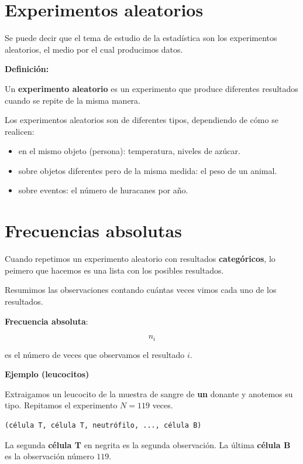 \documentclass[
]{book}
\providecommand{\tightlist}{%
  \setlength{\itemsep}{0pt}\setlength{\parskip}{0pt}}
\begin{document}
\hypertarget{experimentos-aleatorios}{%
\section{Experimentos aleatorios}\label{experimentos-aleatorios}}

Se puede decir que el tema de estudio de la estadística son los experimentos aleatorios, el medio por el cual producimos datos.

\textbf{Definición:}

Un \textbf{experimento aleatorio} es un experimento que produce diferentes resultados cuando se repite de la misma manera.

Los experimentos aleatorios son de diferentes tipos, dependiendo de cómo se realicen:

\begin{itemize}
\tightlist
\item
  en el mismo objeto (persona): temperatura, niveles de azúcar.
\item
  sobre objetos diferentes pero de la misma medida: el peso de un animal.
\item
  sobre eventos: el número de huracanes por año.
\end{itemize}

\hypertarget{frecuencias-absolutas}{%
\section{Frecuencias absolutas}\label{frecuencias-absolutas}}

Cuando repetimos un experimento aleatorio con resultados \textbf{categóricos}, lo peimero que hacemos es una lista con los posibles resultados.

Resumimos las observaciones contando cuántas veces vimos cada uno de los resultados.

\textbf{Frecuencia absoluta}:

\[n_i\]

es el número de veces que observamos el resultado \(i\).

\textbf{Ejemplo (leucocitos)}

Extraigamos un leucocito de la muestra de sangre de \textbf{un} donante y anotemos su tipo. Repitamos el experimento \(N=119\) veces.

\begin{verbatim}
(célula T, célula T, neutrófilo, ..., célula B)
\end{verbatim}

La segunda \textbf{célula T} en negrita es la segunda observación. La última \textbf{célula B} es la observación número \(119\).
\end{document}
